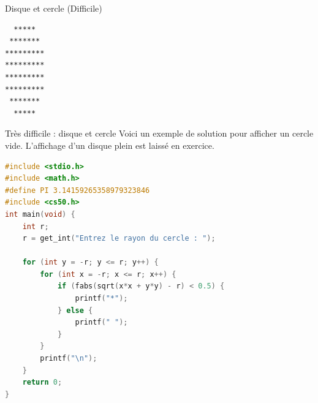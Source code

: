 \begin{UPSTIexercice}{Disque et cercle (Difficile)}
    \begin{verbatim}
  *****
 *******
*********
*********
*********
*********
 *******
  *****
    \end{verbatim}
\end{UPSTIexercice}

\begin{UPSTIprofOnlyEnv}
    \begin{UPSTIcorrectionP}{Très difficile : disque et cercle}
        Voici un exemple de solution pour afficher un cercle vide. L'affichage d'un disque plein est laissé en exercice.
        \begin{lstlisting}[language=C]
#include <stdio.h>
#include <math.h>
#define PI 3.14159265358979323846
#include <cs50.h>
int main(void) {
    int r;
    r = get_int("Entrez le rayon du cercle : ");

    for (int y = -r; y <= r; y++) {
        for (int x = -r; x <= r; x++) {
            if (fabs(sqrt(x*x + y*y) - r) < 0.5) {
                printf("*");
            } else {
                printf(" ");
            }
        }
        printf("\n");
    }
    return 0;
}
        \end{lstlisting}
    \end{UPSTIcorrectionP}
\end{UPSTIprofOnlyEnv}
